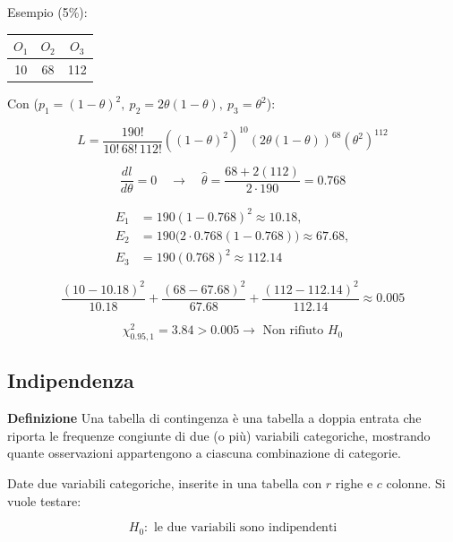 \documentclass{article}
\newcommand{\df}{\noindent\textbf{Definizione} }
\begin{document}
Esempio (5\%):

\begin{table}[ht]
    \centering
    \begin{tabular}{c|c|c}
        $O_1$ & $O_2$ & $O_3$\\
        \hline
        10 & 68 & 112\\
    \end{tabular}
\end{table}

Con ($p_1=(1-\theta)^2,\ p_2=2\theta(1-\theta),\ p_3=\theta^2$):

\vspace{8pt}

\[
L=
\frac{190!}{10!\,68!\,112!}
((1-\theta)^2)^{10}
(2\theta(1-\theta))^{68}
(\theta^2)^{112}
\]

\[
\frac{d l}{d\theta}=0
\quad\longrightarrow\quad
\hat\theta=
\frac{68+2(112)}{2\cdot190}
=0.768
\]

\vspace{8pt}

\[
\begin{aligned}
E_1 &= 190(1-0.768)^2 \approx 10.18,\\
E_2 &= 190\bigl(2\cdot0.768(1-0.768)\bigr) \approx 67.68,\\
E_3 &= 190(0.768)^2 \approx 112.14
\end{aligned}
\]

\vspace{8pt}

$$\frac{(10-10.18)^2}{10.18}+\frac{(68-67.68)^2}{67.68}+\frac{(112-112.14)^2}{112.14}\approx0.005$$

\vspace{7pt}

$$\chi^2_{0.95,1}=3.84>0.005\rightarrow\text{ Non rifiuto $H_0$}$$

\subsection{Indipendenza}

\df Una tabella di contingenza è una tabella a doppia entrata che riporta le frequenze congiunte di due (o più) variabili categoriche, mostrando quante osservazioni appartengono a ciascuna combinazione di categorie.\newline

Date due variabili categoriche, inserite in una tabella con $r$ righe e $c$ colonne. Si vuole testare:

\[
H_0:\text{ le due variabili sono indipendenti}
\]\newline
\end{document}
